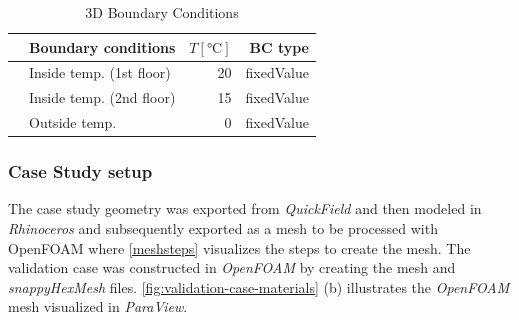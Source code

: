     \begin{table}[tbh]
   
      \caption{3D Boundary Conditions}
      \centering
        \begin{tabular}{llrr}    
            \toprule   
            & Boundary conditions          & $T [\si{\degreeCelsius}]$           & BC type                   \\ 
            \midrule
            & Inside temp.  (1st floor)         & 20                          & fixedValue                \\
            & Inside temp.  (2nd floor)          & 15                          & fixedValue                \\
            & Outside temp.  & 0                          & fixedValue                \\ 
            \bottomrule
        \end{tabular}

\end{table}






\subsubsection{Case Study setup}
The case study geometry was exported from \textit{QuickField} and then modeled in \textit{Rhinoceros} and subsequently exported as a mesh to be processed with OpenFOAM where \ref{meshsteps} visualizes the steps to create the mesh. 
The validation case was constructed in \textit{OpenFOAM} by creating the mesh and \textit{snappyHexMesh} files.  
\ref{fig:validation-case-materials}  (b) illustrates the \textit{OpenFOAM} mesh visualized in \textit{ParaView}.
    


